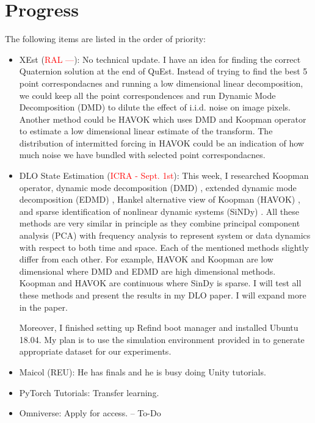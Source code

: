 \documentclass[11pt]{article}
\begin{document}
\section{Progress}
The following items are listed in the order of priority:
\begin{itemize}
    \item XEst (\textcolor{red}{RAL ---}): No technical update. I have an
    idea for finding the correct Quaternion solution at the end of QuEst.
    Instead of trying to find the best 5 point correspondacnes and running a
    low dimensional linear decomposition, we could keep all the point
    correspondences and run Dynamic Mode Decomposition (DMD)
    \cite{schmid2010dynamic} \cite{kutz2016dynamic} to dilute
    the effect of i.i.d. noise on image pixels. Another method could be HAVOK
    \cite{brunton2017chaos} which uses DMD and Koopman operator to estimate
    a low dimensional linear estimate of the transform. The distribution of
    intermitted forcing in HAVOK could be an indication of how much noise we
    have bundled with selected point correspondacnes.


    \item DLO State Estimation (\textcolor{red}{ICRA - Sept. 1st}): This week,
    I researched Koopman operator, dynamic mode decomposition (DMD)
    \cite{kutz2016dynamic} \cite{schmid2010dynamic},
    extended dynamic mode decomposition (EDMD) \cite{williams2015data},
    Hankel alternative view of Koopman (HAVOK) \cite{brunton2017chaos}, and
    sparse identification of nonlinear dynamic systems (SiNDy) \cite{brunton2016discovering}.
    All these methods are very similar in principle as they combine principal
    component analysis (PCA) with frequency analysis to represent system or data
    dynamics with respect to both time and space. Each of the mentioned methods
    slightly differ from each other. For example, HAVOK and Koopman are low
    dimensional where DMD and EDMD are high dimensional methods. Koopman and
    HAVOK are continuous where SinDy is sparse. I will test all these methods
    and present the results in my DLO paper. I will expand more in the paper.

    Moreover, I finished setting up Refind boot manager and installed Ubuntu 18.04.
    My plan is to use the simulation environment provided in \cite{yu2022shape}
    to generate appropriate dataset for our experiments.

    \item Maicol (REU): He has finals and he is busy doing Unity tutorials.
    \item PyTorch Tutorials: Transfer learning.
    \item Omniverse: Apply for access. -- To-Do

  \end{itemize}


\newpage

\newpage


\end{document}
